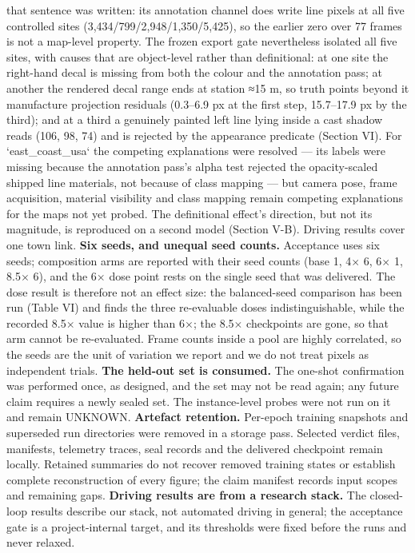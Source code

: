 \documentclass[journal]{IEEEtran}
\begin{document}
that sentence was written: its annotation channel does write line pixels at all five controlled
sites (3,434/799/2,948/1,350/5,425), so the earlier zero over 77 frames is not a map-level property.
The frozen export gate nevertheless isolated all five sites, with causes that are object-level
rather than definitional: at one site the right-hand decal is missing from both the colour and the
annotation pass; at another the rendered decal range ends at station ≈15 m, so truth points beyond
it manufacture projection residuals (0.3--6.9 px at the first step, 15.7--17.9 px by the third);
and at a third a genuinely painted left line lying inside a cast shadow reads (106, 98, 74) and is
rejected by the appearance predicate (Section VI). For `east_coast_usa` the competing explanations
were resolved --- its labels
were missing because the annotation pass's alpha test rejected the opacity-scaled shipped line
materials, not because of class mapping --- but camera pose, frame acquisition, material
visibility and class mapping remain competing explanations for the maps not yet probed.
The definitional effect's direction, but not its
magnitude, is reproduced on a second model (Section V-B). Driving results cover one town link.
\textbf{Six seeds, and unequal seed counts.} Acceptance uses six seeds; composition arms are reported with their
seed counts (base 1, 4$\times$ 6, 6$\times$ 1, 8.5$\times$ 6), and the 6$\times$ dose point rests on the single seed that was delivered.
The dose result is therefore not an effect size: the balanced-seed comparison has been run (Table VI)
and finds the three re-evaluable doses indistinguishable, while the recorded 8.5$\times$ value is higher than
6$\times$; the 8.5$\times$ checkpoints are gone, so that arm cannot be re-evaluated. Frame counts inside a pool are
highly correlated, so the seeds are the unit of variation we report and we do not treat pixels as independent
trials.
\textbf{The held-out set is consumed.} The one-shot confirmation was performed once, as designed, and the
set may not be read again; any future claim requires a newly sealed set. The instance-level probes
were not run on it and remain UNKNOWN.
\textbf{Artefact retention.} Per-epoch training snapshots and superseded run directories were removed in a
storage pass. Selected verdict files, manifests, telemetry traces, seal records and the delivered
checkpoint remain locally. Retained summaries do not recover removed training states or establish
complete reconstruction of every figure; the claim manifest records input scopes and remaining gaps.
\textbf{Driving results are from a research stack.} The closed-loop results describe our stack, not
automated driving in general; the acceptance gate is a project-internal target, and its thresholds
were fixed before the runs and never relaxed.
\end{document}
